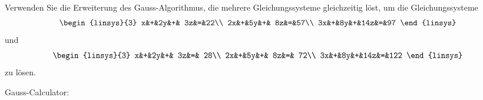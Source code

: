 Verwenden Sie die Erweiterung des Gauss-Algorithmus, die mehrere 
Gleichungssysteme gleichzeitig löst, um die Gleichungssysteme
\begin{equation}
\begin{linsys}{3}
 x&+&2y&+& 3z&=&22\\
2x&+&5y&+& 8z&=&57\\
3x&+&8y&+&14z&=&97
\end{linsys}
\end{equation}
und
\begin{equation}
\begin{linsys}{3}
 x&+&2y&+& 3z&=& 28\\
2x&+&5y&+& 8z&=& 72\\
3x&+&8y&+&14z&=&122
\end{linsys}
\end{equation}
zu lösen.

\begin{hinweis}
Gauss-Calculator: 
\end{hinweis}


